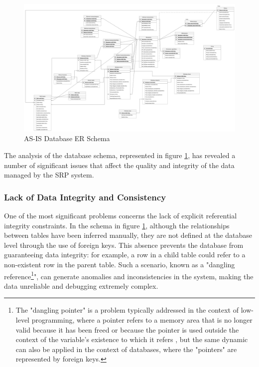 \begin{figure}[htbp]
    \centering
    \includegraphics[width=\textwidth, keepaspectratio]{images/as-is/ER SRM-SRP AS-IS.jpg}
    \caption{AS-IS Database ER Schema}
    \label{fig:er-as-is}
\end{figure}

The analysis of the database schema, represented in figure \ref{fig:er-as-is}, has revealed a number of significant issues that affect the quality and integrity of the data managed by the SRP system.

\subsubsection{Lack of Data Integrity and Consistency}
One of the most significant problems concerns the lack of explicit referential integrity constraints. In the schema in figure \ref{fig:er-as-is}, although the relationships between tables have been inferred manually, they are not defined at the database level through the use of foreign keys. This absence prevents the database from guaranteeing data integrity: for example, a row in a child table could refer to a non-existent row in the parent table. Such a scenario, known as a "dangling reference\footnote{The "dangling pointer" is a problem typically addressed in the context of low-level programming, where a pointer refers to a memory area that is no longer valid because it has been freed or because the pointer is used outside the context of the variable's existence to which it refers \cite{apogeo-fondamenti-programmazione}, but the same dynamic can also be applied in the context of databases, where the "pointers" are represented by foreign keys.}", can generate anomalies and inconsistencies in the system, making the data unreliable and debugging extremely complex.

